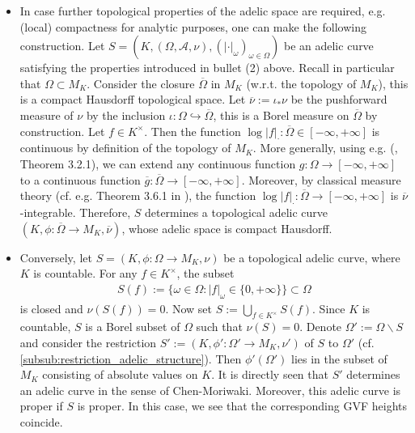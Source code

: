\documentclass [11pt,reqno]{amsart}
\newcommand{\1}{\mathmybb{1}}
\def\cA{{\mathcal{A}}}
\def\setminus{\smallsetminus}
\begin{document}
\begin{itemize}
	\item[(3)] In case further topological properties of the adelic space are required, e.g. (local) compactness for analytic purposes, one can make the following construction. Let $S=(K,(\Omega,\cA,\nu),(|\cdot|_{\omega})_{\omega\in\Omega})$ be an adelic curve satisfying the properties introduced in bullet (2) above. Recall in particular that $\Omega\subset M_{K}$. Consider the closure $\overline{\Omega}$ in $M_{K}$ (w.r.t. the topology of $M_{K}$), this is a compact Hausdorff topological space. Let $\overline{\nu}:=\iota_{\ast}\nu$ be the pushforward measure of $\nu$ by the inclusion $\iota: \Omega \hookrightarrow\overline{\Omega}$, this is a Borel measure on $\overline{\Omega}$ by construction. Let $f\in K^{\times}$. Then the function $\log|f|_{\cdot} : \overline{\Omega}\in [-\infty,+\infty]$ is continuous by definition of the topology of $M_{K}$. More generally, using e.g. (\cite{Engelking89}, Theorem 3.2.1), we can extend any continuous function $g:\Omega \to [-\infty,+\infty]$ to a continuous function $\overline{g}:\overline{\Omega}\to [-\infty,+\infty]$. Moreover, by classical measure theory (cf. e.g. Theorem 3.6.1 in \cite{Bogatchev07}), the function $\log|f|_{\cdot} : \overline{\Omega}\to[-\infty,+\infty]$ is $\overline{\nu}$-integrable. Therefore, $S$ determines a topological adelic curve $(K,\phi:\overline{\Omega}\to M_{K},\overline{\nu})$, whose adelic space is compact Hausdorff. 
	\item[(4)] Conversely, let $S=(K,\phi:\Omega\to M_{K},\nu)$ be a topological adelic curve, where $K$ is countable. For any $f\in K^{\times}$, the subset 
	\begin{align*}
	S(f) := \{\omega\in \Omega : |f|_{\omega} \in \{0,+\infty\}\} \subset \Omega	
	\end{align*}
is closed and $\nu(S(f)) = 0$. Now set $S:=\bigcup_{f\in K^{\times}} S(f)$. Since $K$ is countable, $S$ is a Borel subset of $\Omega$ such that $\nu(S)=0$. Denote $\Omega':=\Omega\setminus S$ and consider the restriction $S':=(K,\phi':\Omega'\to M_{K},\nu')$ of $S$ to $\Omega'$ (cf. \ref{subsub:restriction_adelic_structure}). Then $\phi'(\Omega')$ lies in the subset of $M_{K}$ consisting of absolute values on $K$. It is directly seen that $S'$ determines an adelic curve in the sense of Chen-Moriwaki. Moreover, this adelic curve is proper if $S$ is proper. In this case, we see that the corresponding GVF heights coincide.
\end{itemize}
\end{document}

